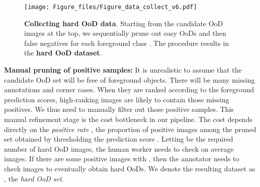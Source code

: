 \documentclass[10pt,twocolumn,letterpaper]{article}
\begin{document}
\begin{figure}[t]
\centering
\texttt{[image: Figure\_files/Figure\_data\_collect\_v6.pdf]}
\vspace{-2em}
\caption{\label{data_collect} \textbf{Collecting hard OoD data}. Starting from the candidate OoD images at the top, we sequentially prune out easy OoDs and then false negatives for each foreground class . The procedure results in the \textbf{hard OoD dataset}.}
\vspace{-1em}
\end{figure}
 
\textbf{Manual pruning of positive samples:}
It is unrealistic to assume that the candidate OoD set will be free of foreground objects. There will be many missing annotations and corner cases. When they are ranked according to the foreground prediction scores, high-ranking images are likely to contain those missing positives. 
We thus need to manually filter out those positive samples.
This manual refinement stage is the cost bottleneck in our pipeline.
The cost depends directly on the \textit{positive rate} , the proportion of positive images among the pruned set obtained by thresholding the prediction score . 
Letting  be the required number of hard OoD images, the human worker needs to check on average  images. If there are some positive images with \eg , then the annotator needs to check  images to eventually obtain  hard OoDs. We denote the resulting dataset as , the \textit{hard OoD set}.
\end{document}
